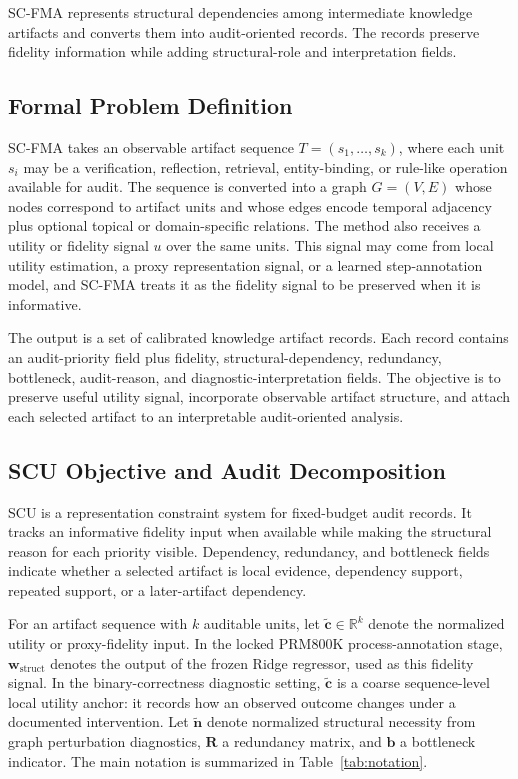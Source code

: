 \documentclass[a4paper,fleqn]{cas-sc}
\newcommand{\wstruct}{\ensuremath{\mathbf{w}_{\mathrm{struct}}}}
\begin{document}
SC-FMA represents structural dependencies among intermediate knowledge artifacts and converts them into audit-oriented records. The records preserve fidelity information while adding structural-role and interpretation fields.

\subsection{Formal Problem Definition}

SC-FMA takes an observable artifact sequence $T=(s_1,\ldots,s_k)$, where each unit $s_i$ may be a verification, reflection, retrieval, entity-binding, or rule-like operation available for audit. The sequence is converted into a graph $G=(V,E)$ whose nodes correspond to artifact units and whose edges encode temporal adjacency plus optional topical or domain-specific relations. The method also receives a utility or fidelity signal $u$ over the same units. This signal may come from local utility estimation, a proxy representation signal, or a learned step-annotation model, and SC-FMA treats it as the fidelity signal to be preserved when it is informative.

The output is a set of calibrated knowledge artifact records. Each record contains an audit-priority field plus fidelity, structural-dependency, redundancy, bottleneck, audit-reason, and diagnostic-interpretation fields. The objective is to preserve useful utility signal, incorporate observable artifact structure, and attach each selected artifact to an interpretable audit-oriented analysis.

\subsection{SCU Objective and Audit Decomposition}
\label{sec:scu-objective}

SCU is a representation constraint system for fixed-budget audit records. It tracks an informative fidelity input when available while making the structural reason for each priority visible. Dependency, redundancy, and bottleneck fields indicate whether a selected artifact is local evidence, dependency support, repeated support, or a later-artifact dependency.

For an artifact sequence with $k$ auditable units, let $\tilde{\mathbf{c}}\in\mathbb{R}^k$ denote the normalized utility or proxy-fidelity input. In the locked PRM800K process-annotation stage, \wstruct{} denotes the output of the frozen Ridge regressor, used as this fidelity signal. In the binary-correctness diagnostic setting, $\tilde{\mathbf{c}}$ is a coarse sequence-level local utility anchor: it records how an observed outcome changes under a documented intervention. Let $\tilde{\mathbf{n}}$ denote normalized structural necessity from graph perturbation diagnostics, $\mathbf{R}$ a redundancy matrix, and $\mathbf{b}$ a bottleneck indicator. The main notation is summarized in Table~\ref{tab:notation}.
\end{document}
